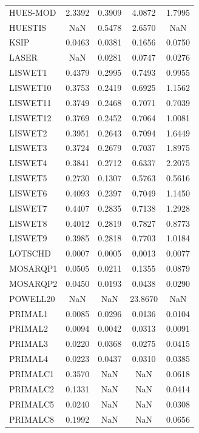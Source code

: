\begin{longtable}{lcccc}
HUES-MOD &   2.3392 &   0.3909 &   4.0872 &   1.7995 \\
HUESTIS  &      NaN &   0.5478 &   2.6570 &      NaN \\
KSIP     &   0.0463 &   0.0381 &   0.1656 &   0.0750 \\
LASER    &      NaN &   0.0281 &   0.0747 &   0.0276 \\
LISWET1  &   0.4379 &   0.2995 &   0.7493 &   0.9955 \\
LISWET10 &   0.3753 &   0.2419 &   0.6925 &   1.1562 \\
LISWET11 &   0.3749 &   0.2468 &   0.7071 &   0.7039 \\
LISWET12 &   0.3769 &   0.2452 &   0.7064 &   1.0081 \\
LISWET2  &   0.3951 &   0.2643 &   0.7094 &   1.6449 \\
LISWET3  &   0.3724 &   0.2679 &   0.7037 &   1.8975 \\
LISWET4  &   0.3841 &   0.2712 &   0.6337 &   2.2075 \\
LISWET5  &   0.2730 &   0.1307 &   0.5763 &   0.5616 \\
LISWET6  &   0.4093 &   0.2397 &   0.7049 &   1.1450 \\
LISWET7  &   0.4407 &   0.2835 &   0.7138 &   1.2928 \\
LISWET8  &   0.4012 &   0.2819 &   0.7827 &   0.8773 \\
LISWET9  &   0.3985 &   0.2818 &   0.7703 &   1.0184 \\
LOTSCHD  &   0.0007 &   0.0005 &   0.0013 &   0.0077 \\
MOSARQP1 &   0.0505 &   0.0211 &   0.1355 &   0.0879 \\
MOSARQP2 &   0.0450 &   0.0193 &   0.0438 &   0.0290 \\
POWELL20 &      NaN &      NaN &  23.8670 &      NaN \\
PRIMAL1  &   0.0085 &   0.0296 &   0.0136 &   0.0104 \\
PRIMAL2  &   0.0094 &   0.0042 &   0.0313 &   0.0091 \\
PRIMAL3  &   0.0220 &   0.0368 &   0.0275 &   0.0415 \\
PRIMAL4  &   0.0223 &   0.0437 &   0.0310 &   0.0385 \\
PRIMALC1 &   0.3570 &      NaN &      NaN &   0.0618 \\
PRIMALC2 &   0.1331 &      NaN &      NaN &   0.0414 \\
PRIMALC5 &   0.0240 &      NaN &      NaN &   0.0308 \\
PRIMALC8 &   0.1992 &      NaN &      NaN &   0.0656 \\

\end{longtable}
